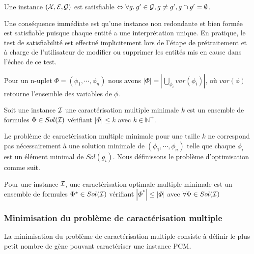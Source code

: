 \begin{proposition}
Une instance $({\cal X},{\cal E},{\cal G})$ est satisfiable $\Leftrightarrow
\forall g,g' \in {\cal G}, g\neq g', g
\cap g' =\emptyset$.
\end{proposition}

Une conséquence immédiate est qu'une instance non redondante et bien formée
est satisfiable puisque chaque entité a une interprétation unique.
En pratique, le test de satisfiabilité est effectué implicitement lors de
l'étape de prétraitement et à charge de l'utilisateur de modifier ou supprimer
les entités mis en cause dans l'échec de ce test.

\begin{definition}
\label{Flength}
Pour un n-uplet $\Phi=(\phi_1,\cdots,\phi_n)$ nous avons $|\Phi| =
|\bigcup_{\phi_i} var(\phi_{i})|$, où $var({\phi})$ retourne l'ensemble des
variables de
$\phi$.
\end{definition}

\begin{definition}
Soit une instance ${\cal I}$ une
caractérisation multiple minimale $k$ est un ensemble de formules
$\Phi \in Sol({\cal I})$ vérifiant $|\Phi| \leq k$ avec $ k\in \mathbb{N}^{+}$.
\end{definition}

Le problème de caractérisation multiple minimale pour une taille $k$ ne
correspond pas nécessairement à une solution minimale de
$(\phi_1,\cdots,\phi_n)$ telle que chaque $\phi_i$ est un élément minimal de
$Sol(g_i)$. Nous définissons le problème d'optimisation comme suit.

\begin{definition}
Pour une instance ${\cal I}$, une
caractérisation optimale multiple minimale est  un ensemble de formules
$\Phi^* \in Sol({\cal I})$ vérifiant $|\Phi^*| \leq |\Phi|$ avec $\forall \Phi
\in Sol({\cal I})$
\end{definition}

\subsubsection*{Minimisation du problème de caractérisation multiple}
La minimisation du problème de caractérisation multiple consiste à définir le plus petit nombre de gène pouvant caractériser une instance PCM.


